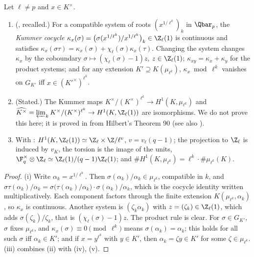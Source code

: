 \begin{proposition}\label{prop:local:kummer-qp}
Let $\ell\ne p$ and $x\in K^\times$.
\begin{enumerate}[label=(\roman*)]
\item (, recalled.) For a compatible system of roots $(x^{1/\ell^k})_k$ in $\Qbar_p$, the \emph{Kummer cocycle}
$\kappa_x(\sigma)=\bigl(\sigma(x^{1/\ell^k})/x^{1/\ell^k}\bigr)_k\in\Z_\ell(1)$ is continuous and satisfies $\kappa_x(\sigma\tau)=\kappa_x(\sigma)+\chi_\ell(\sigma)\kappa_x(\tau)$. Changing the
system changes $\kappa_x$ by the coboundary $\sigma\mapsto(\chi_\ell(\sigma)-1)z$, $z\in\Z_\ell(1)$; $\kappa_{xy}=\kappa_x+\kappa_y$ for the product systems; and for any
extension $K'\supseteq K(\mu_{\ell^k})$, $\kappa_x\bmod\ell^k$ vanishes on $G_{K'}$ iff $x\in(K'^\times)^{\ell^k}$.
\item (Stated.) The Kummer maps $K^\times/(K^\times)^{\ell^k}\to H^1(K,\mu_{\ell^k})$ and $\widehat{K^\times}=\varprojlim_kK^\times/(K^\times)^{\ell^k}\to H^1(K,\Z_\ell(1))$ are
isomorphisms. We do not prove this here; it is proved in  from Hilbert's Theorem 90 (see also \cite[Chapter XIV]{SerreLocalFields}).
\item With : $H^1(K,\Z_\ell(1))\simeq\Z_\ell\times\Z/\ell^{v}$, $v=v_\ell(q-1)$; the projection to $\Z_\ell$ is induced by $v_K$, the torsion is the
image of the units, $\F_q^\times\otimes\Z_\ell\simeq\Z_\ell(1)/(q-1)\Z_\ell(1)$; and $\#H^1(K,\mu_{\ell^k})=\ell^k\cdot\#\mu_{\ell^k}(K)$.
\end{enumerate}
\end{proposition}

\begin{proof}
(i) Write $\alpha_k=x^{1/\ell^k}$. Then $\sigma(\alpha_k)/\alpha_k\in\mu_{\ell^k}$, compatible in $k$, and
$\sigma\tau(\alpha_k)/\alpha_k=\sigma\bigl(\tau(\alpha_k)/\alpha_k\bigr)\cdot\sigma(\alpha_k)/\alpha_k$, which is the cocycle identity written multiplicatively. Each component factors through
the finite extension $K(\mu_{\ell^k},\alpha_k)$, so $\kappa_x$ is continuous. Another system is $(\zeta_k\alpha_k)$ with $z=(\zeta_k)\in\Z_\ell(1)$, which adds
$\sigma(\zeta_k)/\zeta_k$, that is $(\chi_\ell(\sigma)-1)z$. The product rule is clear. For $\sigma\in G_{K'}$, $\sigma$ fixes $\mu_{\ell^k}$, and $\kappa_x(\sigma)\equiv0\pmod{\ell^k}$ means $\sigma(\alpha_k)=\alpha_k$; this holds for all such
$\sigma$ iff $\alpha_k\in K'$; and if $x=y^{\ell^k}$ with $y\in K'$, then $\alpha_k=\zeta y\in K'$ for some $\zeta\in\mu_{\ell^k}$. (iii) combines (ii) with
(iv), (v).
\end{proof}

